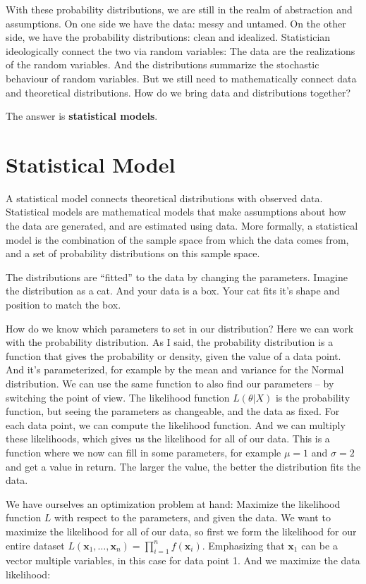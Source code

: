 \documentclass[
  10pt,
]{scrbook}
\begin{document}
With these probability distributions, we are still in the realm of abstraction and assumptions.
On one side we have the data: messy and untamed.
On the other side, we have the probability distributions: clean and idealized.
Statistician ideologically connect the two via random variables:
The data are the realizations of the random variables.
And the distributions summarize the stochastic behaviour of random variables.
But we still need to mathematically connect data and theoretical distributions.
How do we bring data and distributions together?

The answer is \textbf{statistical models}.

\hypertarget{statistical-model}{%
\section{Statistical Model}\label{statistical-model}}

A statistical model connects theoretical distributions with observed data.
Statistical models are mathematical models that make assumptions about how the data are generated, and are estimated using data.
More formally, a statistical model is the combination of the sample space from which the data comes from, and a set of probability distributions on this sample space.

The distributions are ``fitted'' to the data by changing the parameters.
Imagine the distribution as a cat.
And your data is a box.
Your cat fits it's shape and position to match the box.

How do we know which parameters to set in our distribution?
Here we can work with the probability distribution.
As I said, the probability distribution is a function that gives the probability or density, given the value of a data point.
And it's parameterized, for example by the mean and variance for the Normal distribution.
We can use the same function to also find our parameters -- by switching the point of view.
The likelihood function \(L(\theta | X)\) is the probability function, but seeing the parameters as changeable, and the data as fixed.
For each data point, we can compute the likelihood function.
And we can multiply these likelihoods, which gives us the likelihood for all of our data.
This is a function where we now can fill in some parameters, for example \(\mu = 1\) and \(\sigma = 2\) and get a value in return.
The larger the value, the better the distribution fits the data.

We have ourselves an optimization problem at hand: Maximize the likelihood function \(L\) with respect to the parameters, and given the data.
We want to maximize the likelihood for all of our data, so first we form the likelihood for our entire dataset \(L(\mathbf{x}_1, \ldots, \mathbf{x}_n) = \prod_{i=1}^n f(\mathbf{x}_i)\).
Emphasizing that \(\mathbf{x}_1\) can be a vector multiple variables, in this case for data point 1.
And we maximize the data likelihood:
\end{document}
